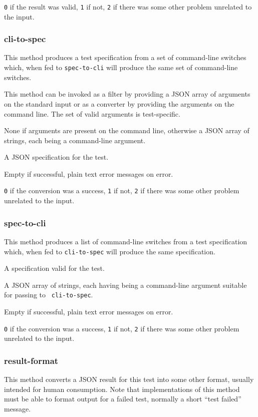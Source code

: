\documentclass[10pt,titlepage]{article}
\begin{document}
 {\tt 0} if the result was valid, {\tt 1} if
not, {\tt 2} if there was some other problem unrelated to the input.



\subsubsection{cli-to-spec}
This method produces a test specification from a set of command-line
switches which, when fed to {\tt spec-to-cli} will produce the same
set of command-line switches.

This method can be invoked as a filter by providing a JSON array of
arguments on the standard input or as a converter by providing the
arguments on the command line.  The set of valid arguments is
test-specific.

 None if arguments are present on the
command line, otherwise a JSON array of strings, each being a
command-line argument.

 A JSON specification for the test.

 Empty if successful, plain text error
messages on error.

 {\tt 0} if the conversion was a success,
            {\tt 1} if not, {\tt 2} if there was some other problem
            unrelated to the input.



\subsubsection{spec-to-cli}
This method produces a list of command-line switches from a test
specification which, when fed to {\tt cli-to-spec} will produce the
same specification.

 A specification valid for the test.

 A JSON array of strings, each having
being a command-line argument suitable for passing to {\tt
  cli-to-spec}.

 Empty if successful, plain text error
messages on error.

 {\tt 0} if the conversion was a success,
            {\tt 1} if not, {\tt 2} if there was some other problem
            unrelated to the input.


\subsubsection{result-format}
This method converts a JSON result for this test into some other
format, usually intended for human consumption.  Note that
implementations of this method must be able to format output for a
failed test, normally a short ``test failed'' message.
\end{document}
